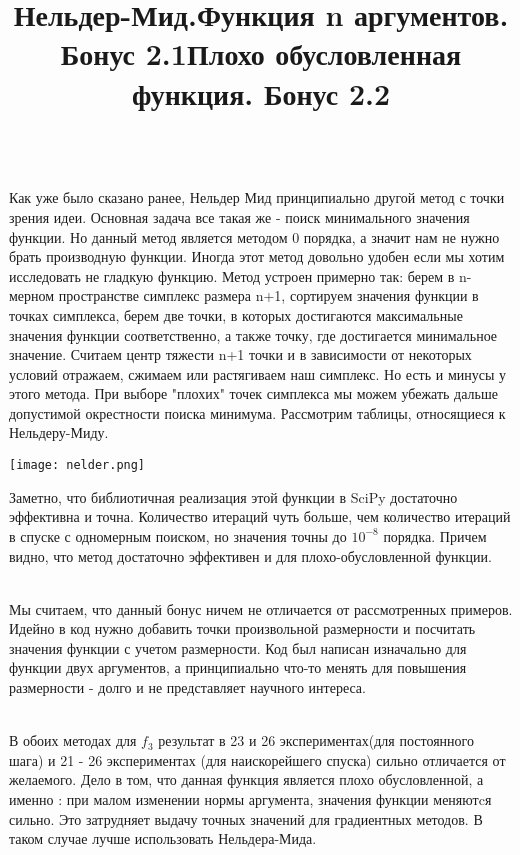 \documentclass[12pt]{article}
\begin{document}
\title{\textbf{Нельдер-Мид.}}
\\
Как уже было сказано ранее, Нельдер Мид принципиально другой метод с точки зрения идеи. Основная задача все такая же - поиск минимального значения функции. Но данный метод является методом 0 порядка, а значит нам не нужно брать производную функции. Иногда этот метод довольно удобен если мы хотим исследовать не гладкую функцию. Метод устроен примерно так: берем в n-мерном пространстве симплекс размера n+1, сортируем значения функции в точках симплекса, берем две точки, в которых достигаются максимальные значения функции соответственно, а также точку, где достигается минимальное значение. Считаем центр тяжести n+1 точки и в зависимости от некоторых условий отражаем, сжимаем или растягиваем наш симплекс. Но есть и минусы у этого метода. При выборе "плохих" точек симплекса мы можем убежать дальше допустимой окрестности поиска минимума. Рассмотрим таблицы, относящиеся к Нельдеру-Миду.


\begin{center}

\centering

\texttt{[image: nelder.png]}


\label{fig:mpr}

\end{center}

Заметно, что библиотичная реализация этой функции в SciPy достаточно эффективна и точна. Количество итераций чуть больше, чем количество итераций в спуске с одномерным поиском, но значения точны до $10^{-8}$ порядка. Причем видно, что метод достаточно эффективен и для плохо-обусловленной функции.

\title{\textbf{Функция n аргументов. Бонус 2.1}} \\
Мы считаем, что данный бонус ничем не отличается от рассмотренных примеров. Идейно в код нужно добавить точки произвольной размерности и посчитать значения функции с учетом размерности. Код был написан изначально для функции двух аргументов, а принципиально что-то менять для повышения размерности - долго и не представляет научного интереса.



\title{\textbf{Плохо обусловленная функция. Бонус 2.2}} \\
В обоих методах для $f_{3}$ результат в 23 и 26 экспериментах(для постоянного шага) и 21 - 26 экспериментах (для наискорейшего спуска) сильно отличается от желаемого. Дело в том, что данная функция является плохо обусловленной, а именно : при малом изменении нормы аргумента, значения функции меняютcя сильно. Это затрудняет выдачу точных значений для градиентных методов. В таком случае лучше использовать Нельдера-Мида.
\end{document}
